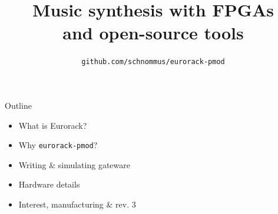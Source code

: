 \documentclass[aspectratio=169]{beamer}
\title{Music synthesis with FPGAs \\and open-source tools}
\subtitle{}
\author{\texttt{github.com/schnommus/eurorack-pmod}}
\institute{me@sebholzapfel.com}
\date{}
\begin{document}
\maketitle

\setwatermark{}









\begin{frame}{Outline}


    \begin{itemize}
        \item What is Eurorack?
        \item Why \texttt{eurorack-pmod}?
        \item Writing \& simulating gateware
        \item Hardware details
        \item Interest, manufacturing \& rev. 3
    \end{itemize}

\end{frame}
\end{document}
